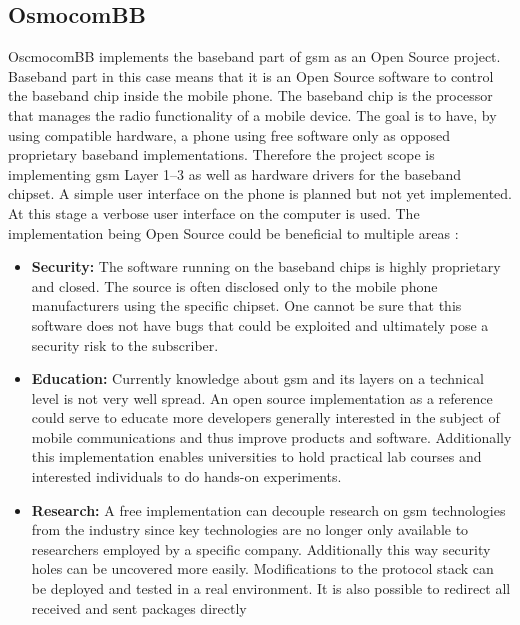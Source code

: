 \subsection{OsmocomBB}
OscmocomBB implements the baseband part of \gls{gsm} as an Open Source project.
Baseband part in this case means that it is an Open Source software to control the baseband chip inside the mobile phone.
The baseband chip is the processor that manages the radio functionality of a mobile device.
The goal is to have, by using compatible hardware, a phone using free software only as opposed proprietary baseband implementations.
Therefore the project scope is implementing \gls{gsm} Layer 1--3 as well as hardware drivers for the baseband chipset.
A simple user interface on the phone is planned but not yet implemented.
At this stage a verbose user interface on the computer is used.
The implementation being Open Source could be beneficial to multiple areas \cite{osmo_rationale}:
\begin{itemize}
	\item \textbf{Security:} The software running on the baseband chips is highly proprietary and closed.
	The source is often disclosed only to the mobile phone manufacturers using the specific chipset.
	One cannot be sure that this software does not have bugs that could be exploited and ultimately pose a security risk to the subscriber.
	\item \textbf{Education:} Currently knowledge about \gls{gsm} and its layers on a technical level is not very well spread.
	An open source implementation as a reference could serve to educate more developers generally interested in the subject of mobile communications and thus improve products and software.
	Additionally this implementation enables universities to hold practical lab courses and interested individuals to do hands-on experiments.
	\item \textbf{Research:} A free implementation can decouple research on \gls{gsm} technologies from the industry since key technologies are no longer only available to researchers employed by a specific company.
	Additionally this way security holes can be uncovered more easily.
	Modifications to the protocol stack can be deployed and tested in a real environment.
	It is also possible to redirect all received and sent packages directly 
\end{itemize}

